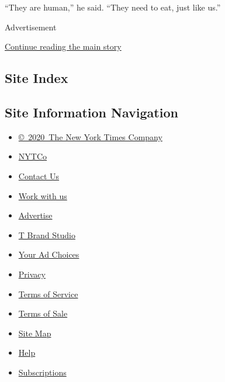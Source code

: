 ``They are human,'' he said. ``They need to eat, just like us.''

Advertisement

\protect\hyperlink{after-bottom}{Continue reading the main story}

\hypertarget{site-index}{%
\subsection{Site Index}\label{site-index}}

\hypertarget{site-information-navigation}{%
\subsection{Site Information
Navigation}\label{site-information-navigation}}

\begin{itemize}
\tightlist
\item
  \href{https://help.nytimes3xbfgragh.onion/hc/en-us/articles/115014792127-Copyright-notice}{©~2020~The
  New York Times Company}
\end{itemize}

\begin{itemize}
\tightlist
\item
  \href{https://www.nytco.com/}{NYTCo}
\item
  \href{https://help.nytimes3xbfgragh.onion/hc/en-us/articles/115015385887-Contact-Us}{Contact
  Us}
\item
  \href{https://www.nytco.com/careers/}{Work with us}
\item
  \href{https://nytmediakit.com/}{Advertise}
\item
  \href{http://www.tbrandstudio.com/}{T Brand Studio}
\item
  \href{https://www.nytimes3xbfgragh.onion/privacy/cookie-policy\#how-do-i-manage-trackers}{Your
  Ad Choices}
\item
  \href{https://www.nytimes3xbfgragh.onion/privacy}{Privacy}
\item
  \href{https://help.nytimes3xbfgragh.onion/hc/en-us/articles/115014893428-Terms-of-service}{Terms
  of Service}
\item
  \href{https://help.nytimes3xbfgragh.onion/hc/en-us/articles/115014893968-Terms-of-sale}{Terms
  of Sale}
\item
  \href{https://spiderbites.nytimes3xbfgragh.onion}{Site Map}
\item
  \href{https://help.nytimes3xbfgragh.onion/hc/en-us}{Help}
\item
  \href{https://www.nytimes3xbfgragh.onion/subscription?campaignId=37WXW}{Subscriptions}
\end{itemize}
